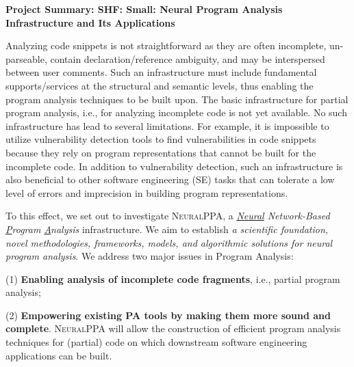 \documentclass[11pt]{article}
\newcommand{\tool}{\textsc{NeuralPPA}\xspace}
\begin{document}



\begin{center}
  {\bf Project Summary: SHF: Small: Neural Program Analysis Infrastructure and Its Applications}
\end{center}
\vspace{-.1in}


Analyzing code snippets is not straightforward as they are often
incomplete, un-parseable, contain declaration/reference ambiguity, and
may be interspersed between user comments. Such an infrastructure must
include fundamental supports/services at the structural and semantic
levels, thus enabling the program analysis techniques to be built
upon. The basic infrastructure for partial program analysis, i.e., for
analyzing incomplete code is not yet available. No such infrastructure
has lead to several limitations. For example, it is impossible to
utilize vulnerability detection tools to find vulnerabilities in code
snippets because they rely on program representations that cannot be
built for the incomplete code. In addition to vulnerability detection,
such an infrastructure is also beneficial to other software
engineering (SE) tasks that can tolerate a low level of errors and
imprecision in building program representations.

To this effect, we set out to investigate {\tool}, a {\em \underline{Neural} Network-Based \underline{P}rogram \underline{A}nalysis} infrastructure. We aim to establish {\em a scientific foundation, novel methodologies, frameworks, models, and algorithmic solutions for neural program analysis}. We address two major issues in Program Analysis:

(1) {\bf Enabling analysis of incomplete code fragments}, i.e.,
partial program analysis;

(2) {\bf Empowering existing PA tools by making them more sound and
  complete}. {\tool} will allow the construction of efficient program
analysis techniques for (partial) code on which downstream software
engineering applications can be built.
\end{document}

